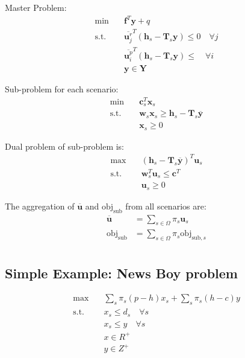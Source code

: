 \documentclass[fleqn,10pt]{wlscirep}
\begin{document}
Master Problem:
\begin{align}
    \min \quad& \mathbf{f} ^ { T } \mathbf{y} + q \\
    \text{s.t.} \quad& \overline{\mathbf{u}_j^r}^T (\mathbf{h}_s - \mathbf{T}_s \mathbf{y}) \leq 0 \quad \forall j \\ 
    & \overline{\mathbf{u}_i^p}^T (\mathbf{h}_s - \mathbf{T}_s \mathbf{y}) \leq \quad \forall i \\ 
    & \mathbf{y} \in \mathbf{Y}
\end{align}

Sub-problem for each scenario:
\begin{align}
    \min \quad & \mathbf{c}_s^T \mathbf{x}_s \\
    \text{s.t.} \quad & \mathbf{w}_s \mathbf{x}_s \geq \mathbf{h}_s - \mathbf{T}_s \overline{\mathbf{y}} \\
    & \mathbf{x}_s \geq 0
\end{align}

Dual problem of sub-problem is:
\begin{align}
    \max \quad & \left(\mathbf{h}_s - \mathbf{T}_s \overline{\mathbf{y}} \right)^T \mathbf{u}_s \\
    \text{s.t.} \quad & \mathbf{w}_s^T \mathbf{u}_s \leq \mathbf{c}^T \\
    & \mathbf{u}_s \geq 0
\end{align}

The aggregation of $\overline{\mathbf{u}}$ and $\text{obj}_{\text{sub}}$ from all scenarios are:
\begin{align}
    \overline{\mathbf{u}} &= \sum_{s \in \Omega} \pi_s \mathbf{u}_s \\
    \text{obj}_{\text{sub}} &= \sum_{s \in \Omega} \pi_s \text{obj}_{\text{sub}, s} \\
\end{align}

\subsection{Simple Example: News Boy problem}

\begin{align}
    \max \quad & \sum_{s} \pi_{s}(p-h) x_{s}+\sum_{s} \pi_{s}(h-c) y \\
    \text{s.t.} \quad & x_{s} \leq d_{s} \quad \forall s \\ 
    & x_{s} \leq y \quad \forall s \\ 
    & x \in R^{+} \\
    & y \in Z^{+} 
\end{align}
\end{document}

